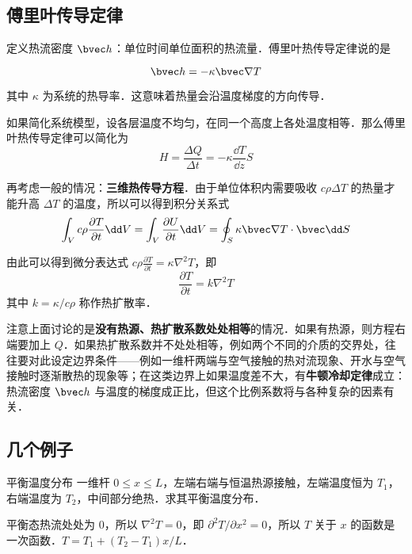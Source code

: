 
\subsection{傅里叶传导定律}
定义热流密度 $\bvec h$：单位时间单位面积的热流量．傅里叶热传导定律说的是

\begin{equation}
\bvec h = -\kappa \bvec \nabla T
\end{equation}

其中 $\kappa$ 为系统的热导率．这意味着热量会沿温度梯度的方向传导．

如果简化系统模型，设各层温度不均匀，在同一个高度上各处温度相等．那么傅里叶热传导定律可以简化为
\begin{equation}
H=\frac{\Delta Q}{\Delta t}=-\kappa \frac{\dd T}{\dd z}S
\end{equation}

再考虑一般的情况：\textbf{三维热传导方程}．由于单位体积内需要吸收 $c\rho \Delta T$ 的热量才能升高 $\Delta T$ 的温度，所以可以得到积分关系式
\begin{equation}
\int_V c\rho \frac{\partial T}{\partial t} \dd V = \int_V \frac{\partial U}{\partial t} \dd V= \oint_S \kappa \bvec \nabla T \cdot \bvec \dd S
\end{equation}

由此可以得到微分表达式 $c\rho \frac{\partial T}{\partial t} = \kappa \nabla^2 T$，即
\begin{equation}
\frac{\partial T}{\partial t}=k\nabla^2 T
\end{equation}
其中 $k=\kappa/c\rho$ 称作热扩散率．

注意上面讨论的是\textbf{没有热源、热扩散系数处处相等}的情况．如果有热源，则方程右端要加上 $Q$．如果热扩散系数并不处处相等，例如两个不同的介质的交界处，往往要对此设定边界条件——例如一维杆两端与空气接触的热对流现象、开水与空气接触时逐渐散热的现象等；在这类边界上如果温度差不大，有\textbf{牛顿冷却定律}成立：热流密度 $\bvec h$ 与温度的梯度成正比，但这个比例系数将与各种复杂的因素有关．


\subsection{几个例子}
\begin{example}{平衡温度分布}
一维杆 $0\le x\le L$，左端右端与恒温热源接触，左端温度恒为 $T_1$，右端温度为 $T_2$，中间部分绝热．求其平衡温度分布．
\end{example}
平衡态热流处处为 $0$，所以 $\nabla^2 T=0$，即 $\partial^2 T/\partial x^2=0$，所以 $T$ 关于 $x$ 的函数是一次函数．$T=T_1+(T_2-T_1)x/L$．


